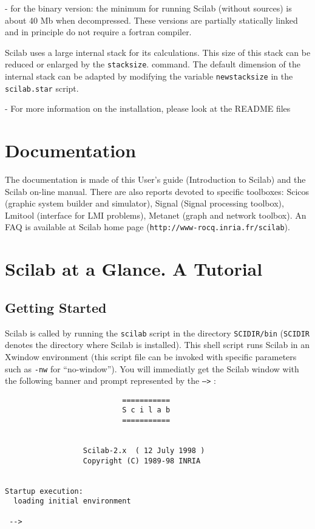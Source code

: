 - for the binary version: the minimum for running Scilab (without
sources) is about 40 Mb when decompressed.
These versions  are partially statically linked and in principle do not require a fortran compiler.

\label{stks}
Scilab uses a large internal stack for its calculations. This size
of this stack can be reduced or enlarged by the 
{\tt stacksize}.
command. The default dimension of the internal stack can be adapted
by modifying the variable {\tt newstacksize} in the {\tt scilab.star}
script.

- For more information on the installation, please look at the README files

\section{Documentation}

The documentation is made of this User's guide (Introduction to
Scilab) and the Scilab on-line manual. There are also
reports devoted to specific toolboxes: Scicos (graphic system builder
and simulator), Signal (Signal processing toolbox), Lmitool (interface for 
LMI problems), Metanet (graph and network toolbox). An FAQ is
available at Scilab home page 
(\verb!http://www-rocq.inria.fr/scilab!).

\section{Scilab at a Glance. A Tutorial}

\subsection{Getting Started}

Scilab is called by running the {\tt scilab} script in the 
directory {\tt SCIDIR/bin} ({\tt SCIDIR} denotes the directory 
where Scilab is installed).
This shell script  runs Scilab in an Xwindow environment (this 
script file can be invoked with
specific parameters such as \verb!-nw! for ``no-window'').
You will immediatly get the Scilab window with the following banner and 
prompt represented by the {\tt -->} : 


\bigskip

\begin{verbatim}
                           ===========
                           S c i l a b
                           ===========
 
 
                  Scilab-2.x  ( 12 July 1998 ) 
                  Copyright (C) 1989-98 INRIA 
 
 
Startup execution:
  loading initial environment
   
 -->

\end{verbatim}


